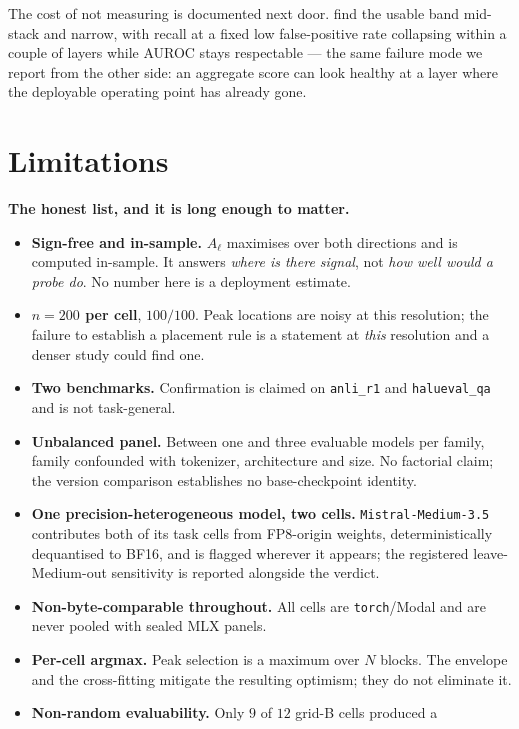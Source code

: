 \documentclass[10pt, letterpaper]{article}
\begin{document}
The cost of not measuring is documented next door. \citet{apollo2025probes} find the usable band
mid-stack and narrow, with recall at a fixed low false-positive rate collapsing within a couple of
layers while AUROC stays respectable --- the same failure mode we report from the other side: an
aggregate score can look healthy at a layer where the deployable operating point has already
gone.

\section{Limitations}
\label{sec:limits}

\textbf{The honest list, and it is long enough to matter.}
\begin{itemize}[leftmargin=1.4em, itemsep=0.2em]
  \item \textbf{Sign-free and in-sample.} $A_\ell$ maximises over both directions
    and is computed in-sample. It answers \emph{where is there signal}, not
    \emph{how well would a probe do}. No number here is a deployment estimate.
  \item \textbf{$n=200$ per cell}, $100/100$. Peak locations are noisy at this
    resolution; the failure to establish a placement rule is a statement at
    \emph{this} resolution and a denser study could find one.
  \item \textbf{Two benchmarks.} Confirmation is claimed on \texttt{anli\_r1} and
    \texttt{halueval\_qa} and is not task-general.
  \item \textbf{Unbalanced panel.} Between one and three evaluable models per
    family, family confounded with tokenizer, architecture and size. No factorial claim; the version comparison
    establishes no base-checkpoint identity.
  \item \textbf{One precision-heterogeneous model, two cells.}
    \texttt{Mistral-Medium-3.5} contributes both of its task cells from FP8-origin
    weights, deterministically dequantised to BF16, and is flagged wherever it
    appears; the registered leave-Medium-out sensitivity is reported alongside the
    verdict.
  \item \textbf{Non-byte-comparable throughout.} All cells are \texttt{torch}/Modal
    and are never pooled with sealed MLX panels.
  \item \textbf{Per-cell argmax.} Peak selection is a maximum over $N$ blocks. The
    envelope and the cross-fitting mitigate the resulting optimism; they do not
    eliminate it.
  \item \textbf{Non-random evaluability.} Only $9$ of $12$ grid-B cells produced a

\end{itemize}
\end{document}

